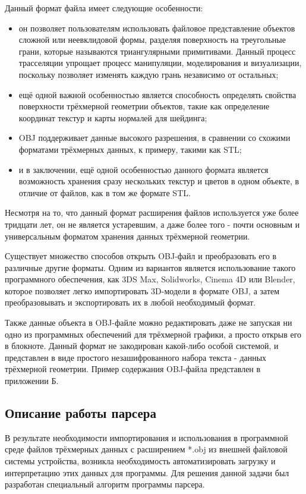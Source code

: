 Данный формат файла имеет следующие особенности:
\begin{itemize}
	\item он позволяет пользователям использовать файловое представление объектов сложной или неевклидовой формы, разделяя поверхность на треугольные грани, которые называются триангулярными примитивами. Данный процесс трасселяции упрощает процесс манипуляции, моделирования и визуализации, поскольку позволяет изменять каждую грань независимо от остальных;
	\item ещё одной важной особенностью является способность определять свойства поверхности трёхмерной геометрии объектов, такие как определение координат текстур и карты нормалей для шейдинга;
	\item OBJ поддерживает данные высокого разрешения, в сравнении со схожими форматами трёхмерных данных, к примеру, такими как STL;
	\item и в заключении, ещё одной особенностью данного формата является возможность хранения сразу нескольких текстур и цветов в одном объекте, в отличие от файлов, как в том же формате STL.
\end{itemize}

Несмотря на то, что данный формат расширения файлов используется уже более тридцати лет, он не является устаревшим, а даже более того - почти основным и универсальным форматом хранения данных трёхмерной геометрии. 

Существует множество способов открыть OBJ-файл и преобразовать его в различные другие форматы. Одним из вариантов является использование такого программного обеспечения, как 3DS Max, Solidworks, Cinema 4D или Blender, которое позволяет легко импортировать 3D-модели в формате OBJ, а затем преобразовывать и экспортировать их в любой необходимый формат.

Также данные объекта в OBJ-файле можно редактировать даже не запуская ни одно из программных обеспечений для трёхмерной графики, а просто открыв его в блокноте. Данный формат не закодирован какой-либо особой системой, и представлен в виде простого незашифрованного набора текста - данных трёхмерной геометрии. Пример содержания OBJ-файла представлен в приложении Б.

\subsection{Описание работы парсера}

В результате необходимости импортирования и использования в программной среде файлов трёхмерных данных с расширением *.obj из внешней файловой системы устройства, возникла необходимость автоматизировать загрузку и интерпретацию этих данных для программы. Для решения данной задачи был разработан специальный алгоритм программы парсера.

